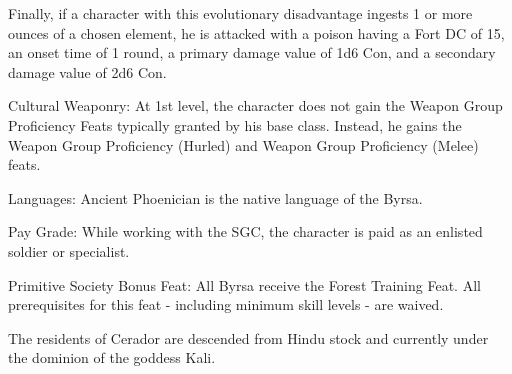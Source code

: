 \begin{itemize*}
Finally, if a character with this evolutionary disadvantage ingests 1 or more ounces of a chosen element, he is attacked with a poison having a Fort DC of 15, an onset time of 1 round, a primary damage value of 1d6 Con, and a secondary damage value of 2d6 Con.
\item Cultural Weaponry: At 1st level, the character does not gain the Weapon Group Proficiency Feats typically granted by his base class. Instead, he gains the Weapon Group Proficiency (Hurled) and Weapon Group Proficiency (Melee) feats.
\item Languages: Ancient Phoenician is the native language of the Byrsa.
\item Pay Grade: While working with the SGC, the character is paid as an enlisted soldier or specialist.
\item Primitive Society Bonus Feat: All Byrsa receive the Forest Training Feat. All prerequisites for this feat - including minimum skill levels - are waived.
\end{itemize*}

The residents of Cerador are descended from Hindu stock and currently under the dominion of the goddess Kali.


